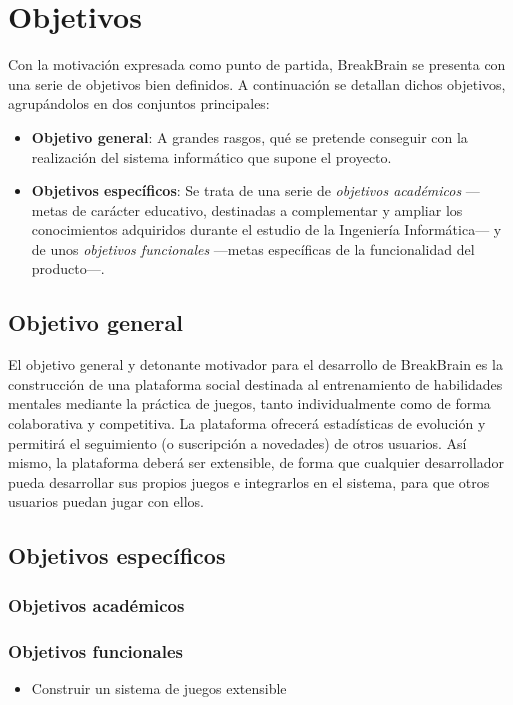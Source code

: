 \section{Objetivos}

Con la motivación expresada como punto de partida, BreakBrain se presenta con una serie de objetivos bien definidos. A continuación se detallan dichos objetivos, agrupándolos en dos conjuntos principales:

\begin{itemize}
\item {\bf Objetivo general}: A grandes rasgos, qué se pretende conseguir con la realización del sistema informático que supone el proyecto.
\item {\bf Objetivos específicos}: Se trata de una serie de {\it objetivos académicos} ---metas de carácter educativo, destinadas a complementar y ampliar los conocimientos adquiridos durante el estudio de la Ingeniería Informática--- y de unos {\it objetivos funcionales} ---metas específicas de la funcionalidad del producto---.
\end{itemize}

\subsection{Objetivo general}

El objetivo general y detonante motivador para el desarrollo de BreakBrain es la construcción de una plataforma social destinada al entrenamiento de habilidades mentales mediante la práctica de juegos, tanto individualmente como de forma colaborativa y competitiva. La plataforma ofrecerá estadísticas de evolución y permitirá el seguimiento (o suscripción a novedades) de otros usuarios. Así mismo, la plataforma deberá ser extensible, de forma que cualquier desarrollador pueda desarrollar sus propios juegos e integrarlos en el sistema, para que otros usuarios puedan jugar con ellos.

\subsection{Objetivos específicos}

\subsubsection{Objetivos académicos}

\subsubsection{Objetivos funcionales}


\begin{itemize}
\item Construir un sistema de juegos extensible
\end{itemize}


